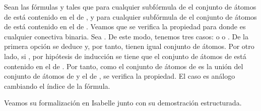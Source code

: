 \begin{isabellebody}
\begin{isamarkuptext}
\begin{demostracion}
  Sean las fórmulas  y  tales que para cualquier subfórmula 
  de  el conjunto de átomos de  está contenido en el de , y
  para cualquier subfórmula  de  el conjunto de átomos de 
  está contenido en el de . Veamos que se verifica la propiedad
  para  donde \isa{{\isacharasterisk}} es cualquier conectiva binaria. 
  Sea . De este modo,
  tenemos tres casos:  o  o 
  . De la primera opción se deduce  y, por
  tanto, tienen igual conjunto de átomos. Por otro lado, si 
  , por hipótesis de inducción se tiene que el conjunto
  de átomos de  está contenido en el de . Por tanto, como el
  conjunto de átomos de  es la unión del conjunto de átomos de 
   y el de , se verifica la propiedad. El caso 
  es análogo cambiando el índice de la fórmula.   
  \end{demostracion}

  Veamos su formalización en Isabelle junto con su demostración 
  estructurada.


\end{isamarkuptext}
\end{isabellebody}

